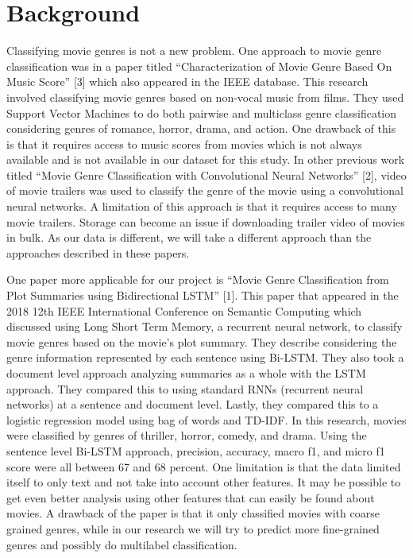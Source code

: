 \documentclass[sigconf]{acmart}
\begin{document}
\section{Background}

Classifying movie genres is not a new problem. One approach to movie genre classification was in a paper titled ``Characterization of Movie Genre Based On Music Score'' [3] which also appeared in the IEEE database.  This research involved classifying movie genres based on non-vocal music from films.  They used Support Vector Machines to do both pairwise and multiclass genre classification considering genres of romance, horror, drama, and action.  One drawback of this is that it requires access to music scores from movies which is not always available and is not available in our dataset for this study.  In other previous work titled ``Movie Genre Classification with Convolutional Neural Networks'' [2], video of movie trailers was used to classify the genre of the movie using a convolutional neural networks. A limitation of this approach is that it requires access to many movie trailers.  Storage can become an issue if downloading trailer video of movies in bulk. As our data is different, we will take a different approach than the approaches described in these papers. \linebreak

One paper more applicable for our project is ``Movie Genre Classification from Plot Summaries using Bidirectional LSTM'' [1]. This paper that appeared in the 2018 12th IEEE International Conference on Semantic Computing which discussed using Long Short Term Memory, a recurrent neural network, to classify movie genres based on the movie's plot summary.  They describe considering the genre information represented by each sentence using Bi-LSTM. They also took a document level approach analyzing summaries as a whole with the LSTM approach.  They compared this to using standard RNNs (recurrent neural networks) at a sentence and document level.  Lastly, they compared this to a logistic regression model using bag of words and TD-IDF. In this research, movies were classified by genres of thriller, horror, comedy, and drama. Using the sentence level Bi-LSTM approach, precision, accuracy, macro f1, and micro f1 score were all between 67 and 68 percent. One limitation is that the data limited itself to only text and not take into account other features.  It may be possible to get even better analysis using other features that can easily be found about movies. A drawback of the paper is that it only classified movies with coarse grained genres, while in our research we will try to predict more fine-grained genres and possibly do multilabel classification.
\end{document}
